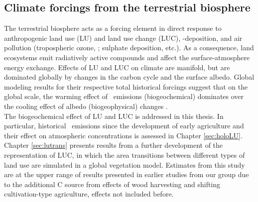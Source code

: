 \subsection{Climate forcings from the terrestrial biosphere}
\label{sec:terrforc}
The terrestrial biosphere acts as a forcing element in direct response to anthropogenic land use (LU) and land use change (LUC), \nr -deposition, and air pollution (tropospheric ozone, \ooot ; sulphate deposition, etc.). As a consequence, land ecosystems emit radiatively active compounds and affect the surface-atmosphere energy exchange. Effects of LU and LUC on climate are manifold, but are dominated globally by changes in the carbon cycle and the surface albedo. Global modeling results for their respective total historical forcings suggest that on the global scale, the warming effect of \coo\ emissions (biogeochemical) dominates over the cooling effect of albedo (biogeophysical) changes \citep{pongratz10grl}. %
\\

The biogeochemical effect of LU and LUC is addressed in this thesis. In particular, historical \coo\ emissions since the development of early agriculture and their effect on atmospheric concentrations is assessed in Chapter \ref{sec:holoLU}. Chapter \ref{sec:lutrans} presents results from a further development of the representation of LUC, in which the area transitions between different types of land use are simulated in a global vegetation model. Estimates from this study are at the upper range of results presented in earlier studies from our group \citep{strassmann08tel, stocker11bg} due to the additional C source from effects of wood harvesting and shifting cultivation-type agriculture, effects not included before.\\


